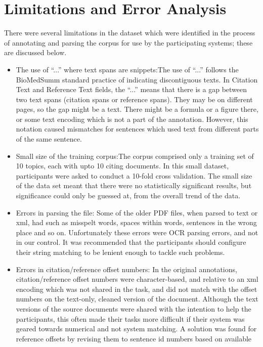 \documentclass[11pt]{article}
\begin{document}
\section{Limitations and Error Analysis}
There were several limitations in the dataset which were identified in the 
process of annotating and parsing the corpus for use by the participating 
systems; these are discussed below.
\begin{itemize}
\item{The use of ``...'' where text spans are snippets}:The use of ``...'' 
	follows the BioMedSumm standard practice of indicating discontiguous texts. 
	In Citation Text and Reference Text fields, the ``...'' means that there is 
	a gap between two text spans (citation spans or reference spans). They may be 
	on different pages, so the gap might be a text. There might be a formula or a 
	figure there, or some text encoding which is not a part of the annotation.
	However, this notation caused mismatches for sentences which used text from 
	different parts of the same sentence.
\item{Small size of the training corpus:}The corpus comprised only a training set 
	of 10 topics, each with upto 10 citing documents. In this small dataset, 
	participants were asked to conduct a 10-fold cross validation. The small 
	size of the data set meant that there were no statistically significant 
	results, but significance could only be guessed at, from the overall trend of 
	the data.
\item{Errors in parsing the file:} Some of the older PDF files, when parsed to 
	text or xml, had such as misspelt words, spaces within words, sentences in 
	the wrong place and so on. Unfortunately these errors were OCR parsing errors, 
	and not in our control. It was recommended that the participants should 
	configure their string matching to be lenient enough to tackle such problems.
\item{Errors in citation/reference offset numbers:} In the original annotations, 
	citation/reference offset numbers were character-based, and relative to an xml 
	encoding which was not shared in the task, and did not match with the offset 
	numbers on the text-only, cleaned version of the document. Although the text 
	versions of the source documents were shared with the intention to help the 
	participants, this often made their tasks more difficult if their system was 
	geared towards numerical and not system matching. A solution was found for 
	reference offsets by revising them to sentence id numbers based on available 

\end{itemize}
\end{document}
